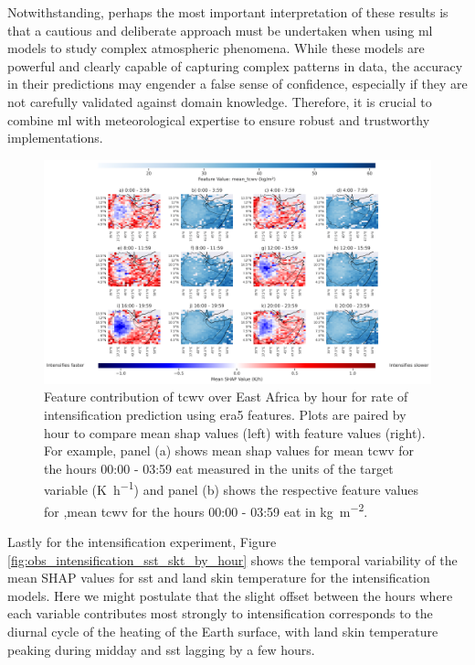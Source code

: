 Notwithstanding, perhaps the most important interpretation of these results is that a cautious and deliberate approach must be undertaken when using \acrshort{ml} models to study complex atmospheric phenomena. While these models are powerful and clearly capable of capturing complex patterns in data, the accuracy in their predictions may engender a false sense of confidence, especially if they are not carefully validated against domain knowledge. Therefore, it is crucial to combine \acrshort{ml} with meteorological expertise to ensure robust and trustworthy implementations.

\begin{figure}[ht]
    \centering
    \includegraphics[width=\textwidth]{../figures/generated/experiments/obs_intensification/geographic_corr/obs_intensification_era5_shap_mean_tcwv_map_by_hour.png}
    \caption{Feature contribution of \acrshort{tcwv} over East Africa by hour for rate of intensification prediction using \acrshort{era5} features. Plots are paired by hour to compare mean \acrshort{shap} values (left) with feature values (right). For example, panel (a) shows mean \acrshort{shap} values for mean \acrshort{tcwv} for the hours 00:00 - 03:59 \acrshort{eat} measured in the units of the target variable (\unit{\kelvin\per\hour}) and panel (b) shows the respective feature values for ,mean \acrshort{tcwv} for the hours 00:00 - 03:59 \acrshort{eat} in \unit{\kilogram\per\meter\squared}.}
    \label{fig:obs_intensification_era5_shap_mean_tcwv_map_by_hour}
\end{figure}

Lastly for the intensification experiment, Figure \ref{fig:obs_intensification_sst_skt_by_hour} shows the temporal variability of the mean SHAP values for \acrfull{sst} and land skin temperature for the intensification models. Here we might postulate that the slight offset between the hours where each variable contributes most strongly to intensification corresponds to the diurnal cycle of the heating of the Earth surface, with land skin temperature peaking during midday and \acrshort{sst} lagging by a few hours.

